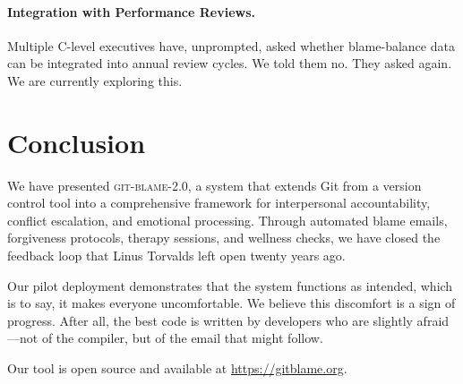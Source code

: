 \documentclass{sigtbd}
\begin{document}
\paragraph{Integration with Performance Reviews.} Multiple C-level executives have, unprompted, asked whether blame-balance data can be integrated into annual review cycles. We told them no. They asked again. We are currently exploring this.

\section{Conclusion}

We have presented \textsc{git-blame-2.0}, a system that extends Git from a version control tool into a comprehensive framework for interpersonal accountability, conflict escalation, and emotional processing. Through automated blame emails, forgiveness protocols, therapy sessions, and wellness checks, we have closed the feedback loop that Linus Torvalds left open twenty years ago.

Our pilot deployment demonstrates that the system functions as intended, which is to say, it makes everyone uncomfortable. We believe this discomfort is a sign of progress. After all, the best code is written by developers who are slightly afraid---not of the compiler, but of the email that might follow.

Our tool is open source and available at \url{https://gitblame.org}.


\end{document}
